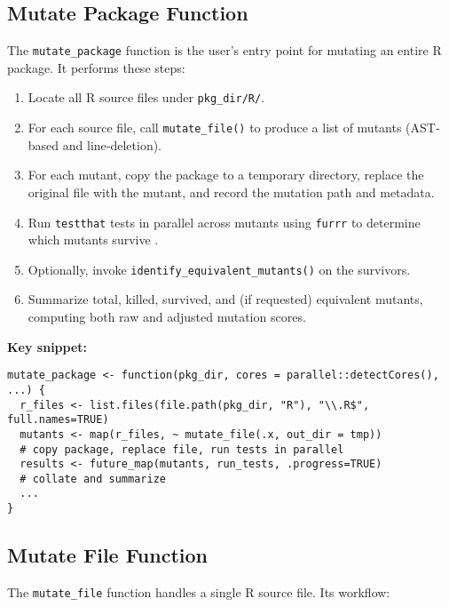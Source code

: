 \subsection{Mutate Package Function}

The \texttt{mutate\_package} function is the user’s entry point for mutating an entire R package.  It performs these steps:

\begin{enumerate}
  \item Locate all R source files under \texttt{pkg\_dir/R/}.  
  \item For each source file, call \texttt{mutate\_file()} to produce a list of mutants (AST‐based and line‐deletion).  
  \item For each mutant, copy the package to a temporary directory, replace the original file with the mutant, and record the mutation path and metadata.  
  \item Run \texttt{testthat} tests in parallel across mutants using \texttt{furrr} to determine which mutants survive \cite{wickham2011testthat,Vaughan2020furrr}.  
  \item Optionally, invoke \texttt{identify\_equivalent\_mutants()} on the survivors.  
  \item Summarize total, killed, survived, and (if requested) equivalent mutants, computing both raw and adjusted mutation scores.
\end{enumerate}

\medskip
\noindent\textbf{Key snippet:}
\begin{verbatim}
mutate_package <- function(pkg_dir, cores = parallel::detectCores(), ...) {
  r_files <- list.files(file.path(pkg_dir, "R"), "\\.R$", full.names=TRUE)
  mutants <- map(r_files, ~ mutate_file(.x, out_dir = tmp))
  # copy package, replace file, run tests in parallel
  results <- future_map(mutants, run_tests, .progress=TRUE)
  # collate and summarize
  ...
}
\end{verbatim}

\subsection{Mutate File Function}

The \texttt{mutate\_file} function handles a single R source file.  Its workflow:

